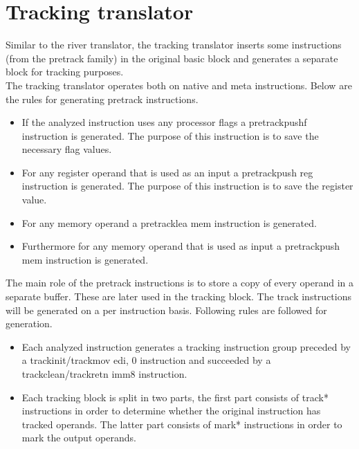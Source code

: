 \documentclass[12pt]{report}
\begin{document}
\section{Tracking translator}
\label{sec:tracking-translator}
Similar to the river translator, the tracking translator inserts some instructions (from the pretrack family) in the original basic block and generates a separate block for tracking purposes.\\
\newline
The tracking translator operates both on native and meta instructions. Below are the rules for generating pretrack instructions.\\
\begin{itemize}
	\item If the analyzed instruction uses any processor flags a pretrackpushf instruction is generated. The purpose of this instruction is to save the necessary flag values.
	\item For any register operand that is used as an input a pretrackpush reg instruction is generated. The purpose of this instruction is to save the register value.
	\item For any memory operand a pretracklea mem instruction is generated.
	\item Furthermore for any memory operand that is used as input a pretrackpush mem instruction is generated.
\end{itemize}

The main role of the pretrack instructions is to store a copy of every operand in a separate buffer. These are later used in the tracking block. The track instructions will be generated on a per instruction basis. Following rules are followed for generation.\\
\begin{itemize}
	\item Each analyzed instruction generates a tracking instruction group preceded by a trackinit/trackmov edi, 0 instruction and succeeded by a trackclean/trackretn imm8 instruction.
	\item Each tracking block is split in two parts, the first part consists of track* instructions in order to determine whether the original instruction has tracked operands. The latter part consists of mark* instructions in order to mark the output operands.
\end{itemize}
\end{document}
